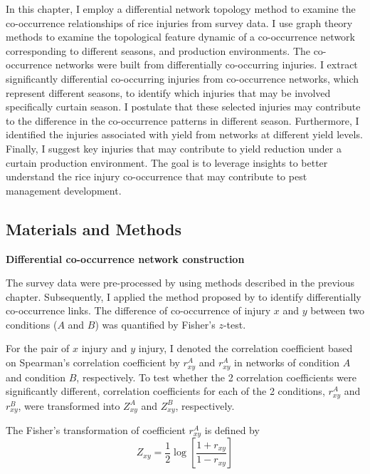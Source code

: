In this chapter, I employ a differential network topology method to examine the co-occurrence relationships of rice injuries from survey data. I use graph theory methods to examine the topological feature dynamic of a co-occurrence network corresponding to different seasons, and production environments. The co-occurrence networks were built from differentially co-occurring injuries. I extract significantly differential co-occurring injuries from co-occurrence networks, which represent different seasons, to identify which injuries that may be involved specifically curtain season. I postulate that these selected injuries may contribute to the difference in the co-occurrence patterns in different season. Furthermore, I identified the injuries associated with yield from networks at different yield levels. Finally, I suggest key injuries that may contribute to yield reduction under a curtain production environment. The goal is to leverage insights to better understand the rice injury co-occurrence that may contribute to pest management development.

\newpage
\subsection{Materials and Methods}

\textbf{Differential co-occurrence network construction}

The survey data were pre-processed by using methods described in the previous chapter. Subsequently, I applied the method proposed by \citet{Fukushima_2013_Diffcorr} to identify differentially co-occurrence links. The difference of co-occurrence of injury $x$ and $y$ between two conditions ($A$ and $B$) was quantified by Fisher's $z$-test.
 
For the pair of $x$ injury and $y$ injury, I denoted the correlation coefficient based on Spearman's correlation coefficient by $r_{xy}^A$ and $r_{xy}^A$ in networks of condition $A$ and condition $B$, respectively. To test whether the 2 correlation coefficients were significantly different, correlation coefficients for each of the 2 conditions, $r_{xy}^A$ and $r_{xy}^B$, were transformed into $Z_{xy}^A$ and $Z_{xy}^B$, respectively.


The Fisher's transformation of coefficient $r_{xy}^A$ is defined by
\begin{equation}
\label{eq:zvalue}
Z_{xy} = \frac{1}{2} \log\left[{\frac{1 + r_{xy}}{1 - r_{xy}}}\right]
\end{equation}

